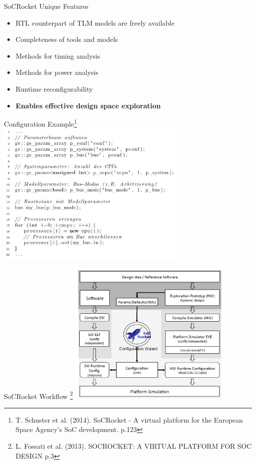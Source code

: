 \begin{frame}{SoCRocket Unique Features}
    \begin{itemize}
        \item RTL counterpart of TLM models are freely available
        \item Completeness of tools and models
        \item Methods for timing analysis
        \item Methods for power analysis
        \item Runtime reconfigurability
        \item \textbf{Enables effective design space exploration}
    \end{itemize}
\end{frame}

\begin{frame}{Configuration Example\footnote{T. Schuster et al. (2014). SoCRocket - A virtual platform for the European Space Agency's SoC development. p.123}}
    \includegraphics[height=7cm]{pictures/configurationExample.JPG}
\end{frame}

\begin{frame}{SoCRocket Workflow \footnote{L. Fossati et al. (2013). SOCROCKET: A VIRTUAL PLATFORM FOR SOC DESIGN p.3}}
    \centering
    \includegraphics[height=7cm]{pictures/SoCRocket_workflow.JPG}
\end{frame}

